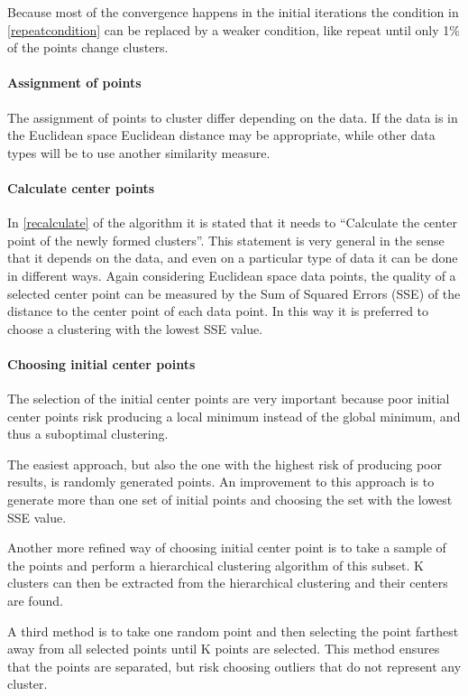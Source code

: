 Because most of the convergence happens in the initial iterations the condition in \cref{repeatcondition} can be replaced by a weaker condition, like repeat until only 1\% of the points change clusters.

\paragraph{Assignment of points} The assignment of points to cluster differ depending on the data.
If the data is in the Euclidean space Euclidean distance may be appropriate, while other data types will be to use another similarity measure.

\paragraph{Calculate center points} In \cref{recalculate} of the algorithm it is stated that it needs to ``Calculate the center point of the newly formed clusters''. 
This statement is very general in the sense that it depends on the data, and even on a particular type of data it can be done in different ways.
Again considering Euclidean space data points, the quality of a selected center point can be measured by the Sum of Squared Errors (SSE) of the distance to the center point of each data point.
In this way it is preferred to choose a clustering with the lowest SSE value.

\paragraph{Choosing initial center points}
The selection of the initial center points are very important because poor initial center points risk producing a local minimum instead of the global minimum, and thus a suboptimal clustering.

The easiest approach, but also the one with the highest risk of producing poor results, is randomly generated points. 
An improvement to this approach is to generate more than one set of initial points and choosing the set with the lowest SSE value. 

Another more refined way of choosing initial center point is to take a sample of the points and perform a hierarchical clustering algorithm of this subset.
K clusters can then be extracted from the hierarchical clustering and their centers are found.

A third method is to take one random point and then selecting the point farthest away from all selected points until K points are selected.
This method ensures that the points are separated, but risk choosing outliers that do not represent any cluster.

